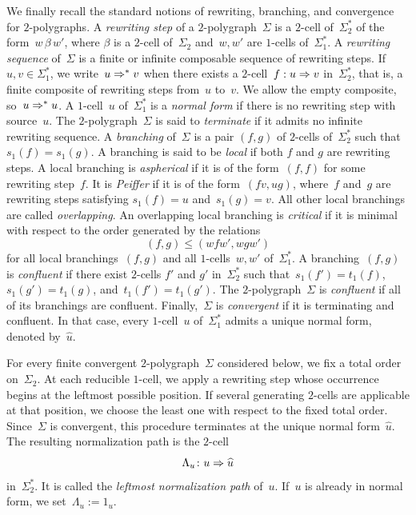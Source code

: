\documentclass[a4paper, twoside, 11pt, english]{article}
\newcommand{\npath}[1]{\Lambda_{#1}}
\begin{document}
We finally recall the standard notions of rewriting, branching, and convergence for $2$-polygraphs.
A \emph{rewriting step} of a $2$-polygraph~$\Sigma$ is a $2$-cell of~$\Sigma_2^\ast$ of the form~$w\,\beta\,w'$,
where $\beta$ is a $2$-cell of~$\Sigma_2$ and~$w,w'$ are $1$-cells of~$\Sigma_1^\ast$.
A \emph{rewriting sequence} of~$\Sigma$ is a finite or infinite
composable sequence of rewriting steps.
If $u,v\in\Sigma_1^\ast$, we write~$u\Rightarrow^\ast v$ when there exists a $2$-cell~$f:u\Rightarrow v$ in~$\Sigma_2^\ast$, that is, a finite
composite of rewriting steps from~$u$ to~$v$. We allow the empty composite, so~$u\Rightarrow^\ast u$.
A $1$-cell~$u$ of~$\Sigma_1^\ast$ is a \emph{normal form} if there is no rewriting step with source~$u$.
The $2$-polygraph~$\Sigma$ is said to \emph{terminate} if it admits no infinite rewriting sequence.
A \emph{branching} of~$\Sigma$ is a pair $(f,g)$ of $2$-cells of~$\Sigma_2^\ast$ such that~$s_1(f)=s_1(g)$.
A branching is said to be \emph{local} if both $f$ and $g$ are rewriting steps.
A local branching is \emph{aspherical} if it is of the form~$(f,f)$
for some rewriting step~$f$. It is \emph{Peiffer} if it is of the
form~$(fv,ug)$, where~$f$ and~$g$ are rewriting steps satisfying
$s_1(f)=u$ and~$s_1(g)=v$. All other local branchings are called
\emph{overlapping}.
An overlapping local branching is \emph{critical} if it is minimal with respect to the order generated by the relations
\[
(f,g)\leq (wfw',wgw')
\]
for all local branchings~$(f,g)$ and all $1$-cells~$w,w'$ of~$\Sigma_1^\ast$.
A branching~$(f,g)$ is \emph{confluent} if there exist $2$-cells $f'$ and $g'$ in~$\Sigma_2^\ast$ such that~$s_1(f')=t_1(f)$, $s_1(g')=t_1(g)$, and~$t_1(f')=t_1(g')$.
The $2$-polygraph~$\Sigma$ is \emph{confluent} if all of its branchings are confluent.
Finally,~$\Sigma$ is \emph{convergent} if it is terminating and confluent.
In that case, every $1$-cell~$u$ of~$\Sigma_1^\ast$ admits a unique normal form, denoted by~$\widehat u$.
 
For every finite convergent $2$-polygraph~$\Sigma$ considered below, we fix
a total order on~$\Sigma_2$. At each reducible $1$-cell, we apply a rewriting
step whose occurrence begins at the leftmost possible position. If several
generating $2$-cells are applicable at that position, we choose the least one
with respect to the fixed total order. Since~$\Sigma$ is convergent, this
procedure terminates at the unique normal form~$\widehat u$. 
The resulting normalization path is the $2$-cell
\[
\npath{u}\colon u\dfl\widehat u
\]
in~$\Sigma_2^\ast$. It is called the \emph{leftmost normalization path} of~$u$. If~$u$ is
already in normal form, we set~$\npath{u}:=1_u$.
\end{document}
